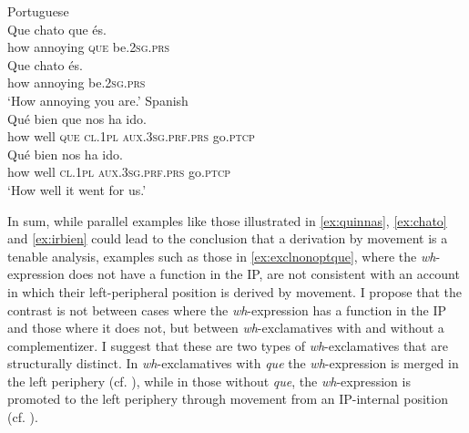 \ea \label{ex:chato}
\ea\label{ex:chatoa}
Portuguese\\ 
\gll Que chato que és. \\
		how annoying \textsc{que} be.\textsc{2sg.prs}\\
		\ex\label{ex:chatob}\gll Que chato és. \\
		how annoying be.\textsc{2sg.prs}\\
		\glt `How annoying you are.' 
	\z
\ex \label{ex:irbien}
\ea\label{ex:irbiena}
		Spanish\\
\gll Qué bien que nos ha ido. \\
		how well \textsc{que} \textsc{cl.1pl} \textsc{aux.3sg.prf.prs} go.\textsc{ptcp}\\
		\ex\label{ex:irbienb}
		\gll  Qué bien nos ha ido. \\
		how well  \textsc{cl.1pl} \textsc{aux.3sg.prf.prs} go.\textsc{ptcp}\\
		\glt `How well it went for us.'
	\z
\z


In sum, while parallel examples  like those illustrated in \eqref{ex:quinnas}, \eqref{ex:chato} and \eqref{ex:irbien} could lead to the conclusion that a derivation by movement is a tenable analysis, examples such as those in \eqref{ex:exclnonoptque}, where the \textit{wh}-expression does not have a function in the IP, are not consistent with an account in which their left-peripheral position is  derived by movement. I propose that the contrast is not between cases where the \textit{wh}-expression has a function in the IP and those where it does not, but  between \textit{wh}-exclamatives with and without a complementizer. I suggest that these  are two types of \textit{wh}-exclamatives that are structurally distinct. In \textit{wh}-exclamatives with  \emph{que} the \textit{wh}-expression is merged  in the left periphery (cf. ),  while in those without \emph{que}, the \textit{wh}-expression is promoted to the left periphery through movement from an IP-internal position (cf. ).


